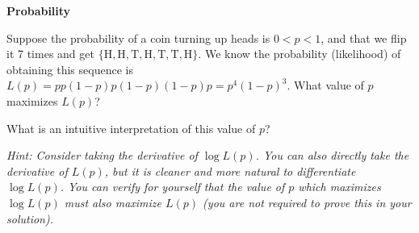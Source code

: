 \item {} {\bf Probability}

Suppose the probability of a coin turning up heads is $0 < p < 1$, and that
we flip it 7 times and get $\{ \text{H}, \text{H}, \text{T}, \text{H}, \text{T}
, \text{T}, \text{H}  \}$. We know the probability (likelihood) of obtaining
this sequence is $L(p) = p p (1-p) p (1-p) (1-p) p = p^4(1-p)^3$. What value of
$p$ maximizes $L(p)$?

What is an intuitive interpretation of this value of $p$?

{\em Hint: Consider taking the derivative of $\log L(p)$. You can also directly
take the derivative of $L(p)$, but it is cleaner and more natural to
differentiate $\log L(p)$. You can verify for yourself that the value of $p$
which maximizes $\log L(p)$ must also maximize $L(p)$ (you are not required to
prove this in your solution).}
